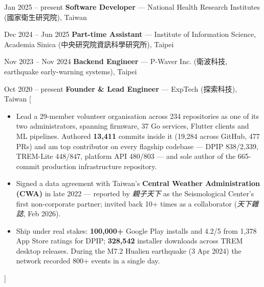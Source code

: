 \documentclass{resume}
\begin{document}
\begin{experiences}
  \experience%
    {Jan 2025 -- present}%
    {\textbf{Software Developer} --- National Health Research Institutes
      (國家衛生研究院), Taiwan}

  \separator{0.6em}

  \experience%
    {Dec 2024 -- Jun 2025}%
    {\textbf{Part-time Assistant} --- Institute of Information Science,
      Academia Sinica (中央研究院資訊科學研究所), Taipei}

  \separator{0.6em}

  \experience%
    {Nov 2023 -- Nov 2024}%
    {\textbf{Backend Engineer} --- P-Waver Inc.
      (衛波科技, earthquake early-warning systems), Taipei}

  \separator{0.6em}

  \experience%
    {Oct 2020 -- present}%
    {\textbf{Founder \& Lead Engineer} --- ExpTech (探索科技), Taiwan}%
    [\begin{itemize}
      \item Lead a 29-member volunteer organisation across 234 repositories as one of its two
        administrators, spanning firmware, 37 Go services, Flutter clients and ML pipelines.
        Authored \textbf{13,411} commits inside it (19,284 across GitHub, 477 PRs) and am top
        contributor on every flagship codebase --- DPIP 838/2,339, TREM-Lite 448/847, platform API
        480/803 --- and sole author of the 665-commit production infrastructure repository.
      \item Signed a data agreement with Taiwan's \textbf{Central Weather Administration (CWA)} in
        late 2022 --- reported by \emph{親子天下} as the Seismological Center's first non-corporate
        partner; invited back 10+ times as a collaborator (\emph{天下雜誌}, Feb 2026).
      \item Ship under real stakes: \textbf{100,000+} Google Play installs and 4.2/5 from 1,378
        App Store ratings for DPIP; \textbf{328,542} installer downloads across TREM desktop
        releases. During the M7.2 Hualien earthquake (3 Apr 2024) the network recorded 800+ events
        in a single day.
    \end{itemize}]
\end{experiences}
\end{document}
